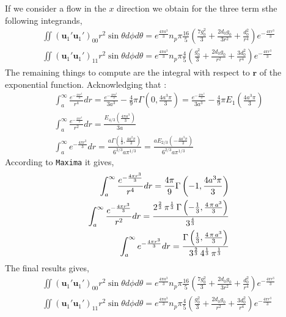 If we consider a flow in the $x$ direction we obtain for the three term sthe following integrands,
\begin{align*}
    \iint (\textbf{u}_1'\textbf{u}_1')_{00} r^2 \sin\theta d\phi d\theta
    = e^{\frac{4 \pi a^{3}}{3}}n_{p} \pi \frac{16}{5}\left(\frac{7   g^{2}_0  }{3} 
    + \frac{2   d_0 g_0 }{3 r^{2}} 
    + \frac{   d^{2}_0 }{ r^{4}} \right)e^{- \frac{4 \pi r^{3}}{3}}\\
    \iint (\textbf{u}_1'\textbf{u}_1')_{11}  r^2 \sin\theta d\phi d\theta
    =e^{\frac{4 \pi a^{3}}{3}}n_{p}\pi\frac{4}{5}
    \left(
        \frac{  g^{2}_0}{3} 
        + \frac{2   d_0 g_0 }{ r^{2}} 
        + \frac{3   d^{2}_0 }{ r^{4}}
    \right)e^{- \frac{4 \pi r^{3}}{3}}
\end{align*}
The remaining things to compute are the integral with respect to $\textbf{r}$ of the exponential function. 
Acknowledging that : 
\begin{align*}
    \int_a^\infty \frac{e^{- \frac{4 \pi r^{3}}{3}}}{r^4} dr
    = \frac{e^{- \frac{4 \pi a^{3}}{3}}}{3a^3}
    - \frac{4}{9} \pi \Gamma\left(0,\frac{4a^3\pi}{3}\right)
    = \frac{e^{- \frac{4 \pi a^{3}}{3}}}{3a^3}
    - \frac{4}{9} \pi E_1\left(\frac{4a^3\pi}{3}\right)
    \\
    \int_a^\infty \frac{e^{- \frac{4 \pi r^{3}}{3}}}{r^2} dr
    = \frac{E_{4/3}(\frac{4\pi a^3}{3})}{3a}\\
    \int_a^\infty e^{- \frac{4 \pi r^{3}}{3}} dr
    = \frac{a \Gamma\left(\frac{1}{3},\frac{4 a^2 \pi}{3}\right)}
    {6^{2/3} a \pi^{1/3}}
    = \frac{a E_{2/3}\left(-\frac{4 a^3 \pi}{3}\right)}
    {6^{2/3} a \pi^{1/3}}
\end{align*}
According to \texttt{Maxima} it gives, 
\begin{align*}
    \int_a^\infty \frac{e^{- \frac{4 \pi r^{3}}{3}}}{r^4} dr
    = 
    \frac{4\pi}{9} \Gamma\left(-1,\frac{4a^3\pi}{3}\right)
    \\
    \int_a^\infty \frac{e^{- \frac{4 \pi r^{3}}{3}}}{r^2} dr
    = {{2^{{{2}\over{3}}}\,\pi^{{{1}\over{3}}}\,\Gamma\left(-{{1
    }\over{3}} , {{4\,\pi\,a^3}\over{3}}\right)}\over{3^{{{4
    }\over{3}}}}}\\
    \int_a^\infty e^{- \frac{4 \pi r^{3}}{3}} dr
    = {{\Gamma\left({{1}\over{3}} , {{4\,\pi\,a^3}\over{3}}\right)}\over{
        3^{{{2}\over{3}}}\,4^{{{1}\over{3}}}\,\pi^{{{1}\over{3}}}}}
\end{align*}
The final results gives, 
\begin{align*}
    \iint (\textbf{u}_1'\textbf{u}_1')_{00} r^2 \sin\theta d\phi d\theta
    = e^{\frac{4 \pi a^{3}}{3}}n_{p} \pi \frac{16}{5}\left(\frac{7   g^{2}_0  }{3} 
    + \frac{2   d_0 g_0 }{3 r^{2}} 
    + \frac{   d^{2}_0 }{ r^{4}} \right)e^{- \frac{4 \pi r^{3}}{3}}\\
    \iint (\textbf{u}_1'\textbf{u}_1')_{11}  r^2 \sin\theta d\phi d\theta
    =e^{\frac{4 \pi a^{3}}{3}}n_{p}\pi\frac{4}{5}
    \left(
        \frac{  g^{2}_0}{3} 
        + \frac{2   d_0 g_0 }{ r^{2}} 
        + \frac{3   d^{2}_0 }{ r^{4}}
    \right)e^{- \frac{4 \pi r^{3}}{3}}
\end{align*}

